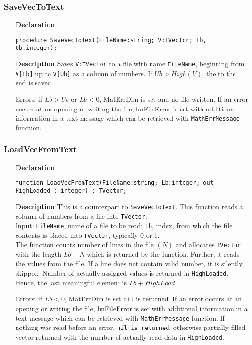 \documentclass[12pt,a4paper,oneside]{report}
\newcommand{\declarationitem}[1]{\textbf{#1}}
\newcommand{\descriptiontitle}[1]{\textbf{#1}}
\newcommand{\code}[1]{\texttt{#1}}
\begin{document}
\subsubsection{SaveVecToText}\label{uvecfileutils:savevectotext}
\begin{itemize}
	\item[\declarationitem{Declaration}\hfill]
	\begin{flushleft}
		\code{procedure SaveVecToText(FileName:string; V:TVector; Lb, Ub:integer);}
	\end{flushleft}
	\item[\descriptiontitle{Description}]
	Saves \code{V:TVector} to a file with name \code{FileName}, beginning from \code{V[Lb]} up to \code{V[Ub]} as a column of numbers. If $Ub>High(V)$, the to the end is saved.
	
	Errors: if $Lb > Ub$ or $Lb < 0$, MatErrDim is set and no file written. If an error occurs at an opening or writing the file, lmFileError is set with additional information in a text message which can be retrieved with \code{MathErrMessage} function. 
\end{itemize}	
\subsubsection{LoadVecFromText}\label{uvecfileutils:loadvecfromtext}
\begin{itemize}
	\item[\declarationitem{Declaration}\hfill]
	\begin{flushleft}
	\code{function LoadVecFromText(FileName:string; Lb:integer; out HighLoaded : integer) : TVector;}
	\end{flushleft}
	\item[\descriptiontitle{Description}] This is a counterpart to \code{SaveVecToText}. This function reads a column of numbers from a file into \code{TVector}. \\ 
	Input: \code{FileName}, name of a file to be read; \code{Lb}, index, from which the file contents is placed into \code{TVector}, typically 0 or 1. \\ 
	The function counts number of lines in the file $(N)$ and allocates \code{TVector} with the length $Lb+N$ which is returned by the function. Further, it reads the values from the file. If a line does not contain valid number, it is silently skipped. Number of actually assigned values is returned in \code{HighLoaded}. Hence, the last meaningful element is $Lb+HighLoad$.
	
	Errors: if $Lb < 0$, MatErrDim is set \code{nil} is returned. If an error occurs at an opening or writing the file, lmFileError is set with additional information in a text message which can be retrieved with \code{MathErrMessage} function. If nothing was read before an error, \code{nil is returned}, otherwise partially filled vector returned with the number of actually read data in \code{HighLoaded}. 
\end{itemize}	
\end{document}
